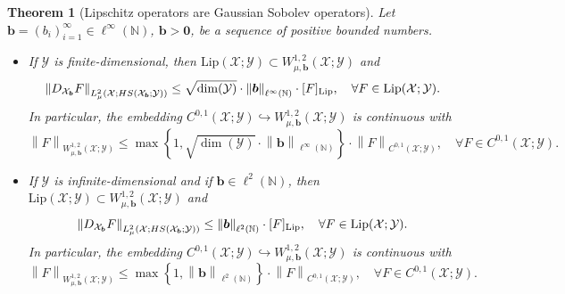\documentclass[namedate,webpdf]{ima-authoring-template-blank}
\newcommand*{\Lip}{\mathrm{Lip}}  %
\newcommand*{\HS}{\textup{HS}}
\newcommand*{\nm}[1]{{\left\|#1\right \|}}
\newcounter{counter}
\numberwithin{counter}{section}
\numberwithin{equation}{section}
\theoremstyle{plain}
\newtheorem{theorem}[counter]{Theorem}
\theoremstyle{definition}
\newcommand*{\cX}{\mathcal{X}}
\newcommand*{\cY}{\mathcal{Y}}
\newcommand*{\bbN}{\mathbb{N}}
\theoremstyle{thmstyletwo}
\begin{document}
\begin{theorem}[Lipschitz operators are Gaussian Sobolev operators]
\label{thm: Lipschitz operators are Gaussian Sobolev operators}
    Let \(\bm{b} = (b_i)_{i=1}^{\infty} \in \ell^{\infty}(\bbN)\), \(\bm{b} > \bm{0}\), be a sequence of positive bounded numbers.
    \begin{itemize}
        \item [(i)] If \(\cY\) is finite-dimensional, then \(\Lip(\cX; \cY) \subset W_{\mu, \bm{b}}^{1,2}(\cX; \cY)\) and 
        \[
        \nm{D_{\cX_{\bm{b}}} F}_{L_{\mu}^2(\cX; \HS(\cX_{\bm{b}}; \cY))} 
        \leq \sqrt{\dim(\cY)} \cdot \nm{\bm{b}}_{\ell^{\infty}(\bbN)} \cdot [F]_{\Lip}, 
        \quad \forall F \in \Lip(\cX; \cY).
        \]
        In particular, the embedding \(C^{0, 1}(\cX; \cY) \hookrightarrow W_{\mu, \bm{b}}^{1,2}(\cX; \cY)\) is continuous with 
        \[
        \nm{F}_{W_{\mu, \bm{b}}^{1,2}(\cX; \cY)} \leq \max\left\{1, \sqrt{\dim(\cY)} \cdot \nm{\bm{b}}_{\ell^{\infty}(\bbN)}\right\} \cdot \nm{F}_{C^{0, 1}(\cX; \cY)}, \quad \forall F \in C^{0, 1}(\cX; \cY).
        \]

        \item [(ii)] If \(\cY\) is infinite-dimensional and if \(\bm{b} \in \ell^2(\bbN)\), then \(\Lip(\cX; \cY) \subset W_{\mu, \bm{b}}^{1,2}(\cX; \cY)\) and 
        \[
        \nm{D_{\cX_{\bm{b}}} F}_{L_{\mu}^2(\cX; \HS(\cX_{\bm{b}}; \cY))} 
        \leq \nm{\bm{b}}_{\ell^2(\bbN)} \cdot [F]_{\Lip}, 
        \quad \forall F \in \Lip(\cX; \cY).
        \]
        In particular, the embedding \(C^{0, 1}(\cX; \cY) \hookrightarrow W_{\mu, \bm{b}}^{1,2}(\cX; \cY)\) is continuous with 
        \[
        \nm{F}_{W_{\mu, \bm{b}}^{1,2}(\cX; \cY)} \leq \max \left\{1, \nm{\bm{b}}_{\ell^2(\bbN)} \right\} \cdot \nm{F}_{C^{0, 1}(\cX; \cY)}, \quad \forall F \in C^{0, 1}(\cX; \cY).
        \]
    \end{itemize}
\end{theorem}
\end{document}
